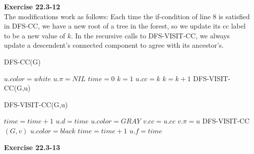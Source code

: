 \documentclass{article}
\begin{document}
\noindent\textbf{Exercise 22.3-12}\\

The modifications work as follows:  Each time the if-condition of line 8 is satisfied in DFS-CC, we have a new root of a tree in the forest, so we update its cc label to be a new value of $k$.  In the recursive calls to DFS-VISIT-CC, we always update a descendent's connected component to agree with its ancestor's. \\

\begin{algorithm}
\caption{DFS-CC(G)}
\begin{algorithmic}[1]
	\State $u.color = white$
	\State $u.\pi = NIL$
\EndFor
\State $time = 0$
\State $k = 1$
		\State $u.cc = k$
		\State $k = k + 1$
		\State DFS-VISIT-CC(G,u)
	\EndIf
\EndFor
\end{algorithmic}
\end{algorithm}


\begin{algorithm}
\caption{DFS-VISIT-CC(G,u)}
\begin{algorithmic}[1]
\State $time = time + 1$
\State $u.d = time$
\State $u.color = GRAY$
	\State $v.cc = u.cc$
		\State $v.\pi = u$
		\State DFS-VISIT-CC$(G,v)$
	\EndIf
\EndFor 
\State $u.color = black$
\State $time = time + 1$
\State $u.f = time$
\end{algorithmic}
\end{algorithm}

\noindent\textbf{Exercise 22.3-13}\\
\end{document}

